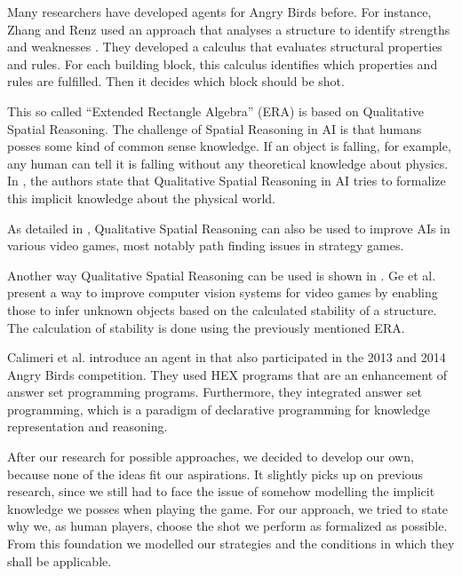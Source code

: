 Many researchers have developed agents for Angry Birds before. For instance, Zhang and Renz used an approach that analyses a structure to identify strengths and weaknesses \cite{zhang2014qualitative}. They developed a calculus that evaluates structural properties and rules. For each building block, this calculus identifies which properties and rules are fulfilled. Then it decides which block should be shot.

This so called ``Extended Rectangle Algebra'' (ERA) is based on Qualitative Spatial Reasoning. The challenge of Spatial Reasoning in AI is that humans posses some kind of common sense knowledge. If an object is falling, for example, any human can tell it is falling without any theoretical knowledge about physics. In \cite{forbus1991qualitative}, the authors state that Qualitative Spatial Reasoning in AI tries to formalize this implicit knowledge about the physical world. 

As detailed in \cite{forbus2002qualitative}, Qualitative Spatial Reasoning can also be used to improve AIs in various video games, most notably path finding issues in strategy games.

Another way Qualitative Spatial Reasoning can be used is shown in \cite{ge2016visual}. Ge et al. present a way to improve computer vision systems for video games by enabling those to infer unknown objects based on the calculated stability of a structure. The calculation of stability is done using the previously mentioned ERA. 

Calimeri et al. introduce an agent in \cite{calimeri2016angry} that also participated in the 2013 and 2014 Angry Birds competition. They used HEX programs that are an enhancement of answer set programming programs. Furthermore, they integrated answer set programming, which is a paradigm of declarative programming for knowledge representation and reasoning.

After our research for possible approaches, we decided to develop our own, because none of the ideas fit our aspirations. It slightly picks up on previous research, since we still had to face the issue of somehow modelling the implicit knowledge we posses when playing the game. For our approach, we tried to state why we, as human players, choose the shot we perform as formalized as possible. From this foundation we modelled our strategies and the conditions in which they shall be applicable.